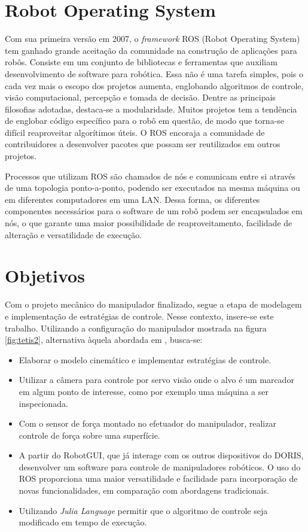 \section{Robot Operating System}
Com sua primeira versão em 2007, o \textit{framework} ROS (Robot Operating System) tem ganhado grande aceitação da comunidade na construção de aplicações para robôs. Consiste em um conjunto de bibliotecas e ferramentas que auxiliam desenvolvimento de software para robótica. Essa não é uma tarefa simples, pois o cada vez mais o escopo dos projetos aumenta, englobando algoritmos de controle, visão computacional, percepção e tomada de decisão.
Dentre as principais filosofias adotadas, destaca-se a modularidade. 
Muitos projetos tem a tendência de englobar código específico para o robô em questão, de modo que torna-se difícil reaproveitar algorítimos úteis. O ROS encoraja a comunidade de contribuidores a desenvolver pacotes que possam ser reutilizados em outros projetos.  

Processos que utilizam ROS são chamados de nós e comunicam entre si através de uma topologia ponto-a-ponto, podendo ser executados na mesma máquina ou em diferentes computadores em uma LAN. Dessa forma, os diferentes componentes necessários para o software de um robô podem ser encapsulados em nós, o que garante uma maior possibilidade de reaproveitamento, facilidade de alteração e versatilidade de execução.


\section{Objetivos}

Com o projeto mecânico do manipulador finalizado, segue a etapa de modelagem e implementação de estratégias de controle. 
Nesse contexto, insere-se este trabalho. Utilizando a configuração do manipulador mostrada na figura \ref{fig:tetis2}, alternativa àquela abordada em \citep{xaud2016doris},  busca-se:
\begin{itemize}
\item Elaborar o modelo cinemático e implementar estratégias de controle. %

\item Utilizar a câmera para controle por servo visão onde o alvo é um marcador em algum ponto de interesse, como por exemplo uma máquina a ser inspecionada. 

\item Com o sensor de força montado no efetuador do manipulador, realizar controle de força sobre uma superfície.

\item A partir do RobotGUI, que já interage com os outros dispositivos do DORIS, desenvolver um software para controle de manipuladores robóticos. O uso do ROS proporciona uma maior versatilidade e facilidade para incorporação de novas funcionalidades, em comparação com abordagens tradicionais.

\item Utilizando \textit{Julia Language} permitir que o algoritmo de controle seja modificado em tempo de execução.
\end{itemize}


